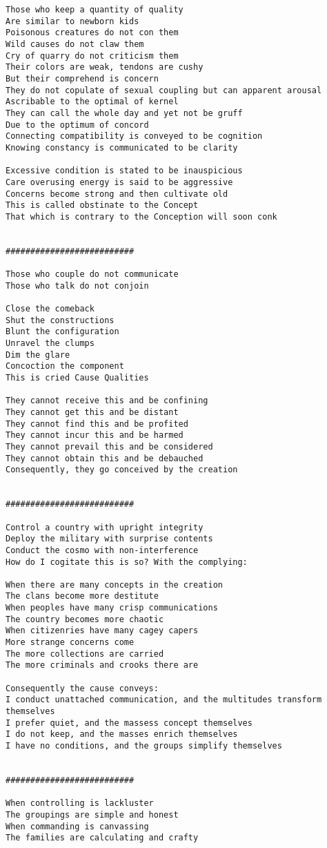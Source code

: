 \documentclass[12pt,a4paper,oneside]{book}
\begin{document}
\begin{verbatim}
Those who keep a quantity of quality
Are similar to newborn kids
Poisonous creatures do not con them
Wild causes do not claw them
Cry of quarry do not criticism them
Their colors are weak, tendons are cushy
But their comprehend is concern
They do not copulate of sexual coupling but can apparent arousal
Ascribable to the optimal of kernel
They can call the whole day and yet not be gruff
Due to the optimum of concord
Connecting compatibility is conveyed to be cognition
Knowing constancy is communicated to be clarity

Excessive condition is stated to be inauspicious
Care overusing energy is said to be aggressive
Concerns become strong and then cultivate old
This is called obstinate to the Concept
That which is contrary to the Conception will soon conk


##########################

Those who couple do not communicate
Those who talk do not conjoin

Close the comeback
Shut the constructions
Blunt the configuration
Unravel the clumps
Dim the glare
Concoction the component
This is cried Cause Qualities

They cannot receive this and be confining
They cannot get this and be distant
They cannot find this and be profited
They cannot incur this and be harmed
They cannot prevail this and be considered
They cannot obtain this and be debauched
Consequently, they go conceived by the creation


##########################

Control a country with upright integrity
Deploy the military with surprise contents
Conduct the cosmo with non-interference
How do I cogitate this is so? With the complying:

When there are many concepts in the creation
The clans become more destitute
When peoples have many crisp communications
The country becomes more chaotic
When citizenries have many cagey capers
More strange concerns come
The more collections are carried
The more criminals and crooks there are

Consequently the cause conveys:
I conduct unattached communication, and the multitudes transform themselves
I prefer quiet, and the massess concept themselves
I do not keep, and the masses enrich themselves
I have no conditions, and the groups simplify themselves


##########################

When controlling is lackluster
The groupings are simple and honest
When commanding is canvassing
The families are calculating and crafty


\end{verbatim}
\end{document}
